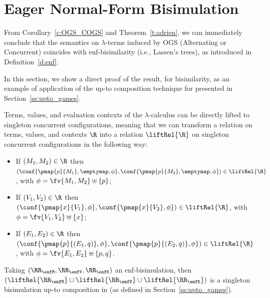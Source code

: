 \section{Eager Normal-Form Bisimulation}
\label{s:enf}


From Corollary~\ref{c:OGS_COGS} and Theorem~\ref{t:adrien},
we can immediately conclude that the semantics on $\lambda$-terms induced by OGS
(Alternating or Concurrent) coincides with 
enf-bisimilarity (i.e., Lassen's trees), as introduced in Definition~\ref{d:enf}. 

In this section, we show a direct proof of the result, for \COGS bisimilarity, 
as an example of application of the  
up-to composition technique for \COGS
 presented in Section~\ref{ss:upto_games}.



Terms, values, and evaluation contexts  of the $\lambda$-calculus can be directly lifted to singleton concurrent configurations,
meaning that we can transform a relation on terms, values, and contexts $\R$ into
a relation $\liftRel{\R}$ on singleton concurrent configurations in the following way:
\begin{itemize}
 \item If $(M_1,M_2) \in \R$ then $(\conf{\pmap{p}{M_1},\emptymap,\phi},
 \conf{\pmap{p}{M_2},\emptymap,\phi}) \in \liftRel{\R}$, 
 with $\phi = \fv{M_1,M_2} \uplus \{p\}$;
%
 \item If $(V_1,V_2) \in \R$ then $(\conf{\pmap{x}{V_1},\phi},\conf{\pmap{x}{V_2},\phi})
 \in \liftRel{\R}$, with $\phi= \fv{V_1,V_2} \uplus \{x\}$;
%
 \item If $(E_1,E_2) \in \R$ then $(\conf{\pmap{p}{(E_1,q)},\phi},
  \conf{\pmap{p}{(E_2,q)},\phi}) \in \liftRel{\R}$, with 
  $\phi= \fv{E_1,E_2} \uplus \{p,q\}$.
\end{itemize}

\begin{theorem}
 Taking $(\RR_{\enfM},\RR_{\enfV},\RR_{\enfK})$ an enf-bisimulation, then 
 $(\liftRel{\RR_{\enfM}} \cup \liftRel{\RR_{\enfV}} \cup \liftRel{\RR_{\enfK}})$
 is a singleton bisimulation up-to composition in \COGS (as defined in Section~\ref{ss:upto_games}).
\end{theorem}

